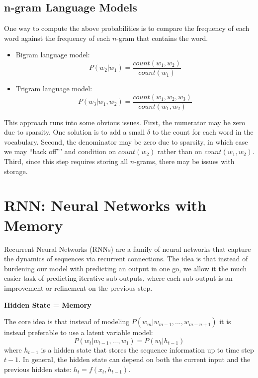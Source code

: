 \documentclass[
]{book}
\begin{document}
\hypertarget{n-gram-language-models}{%
\subsection{n-gram Language Models}\label{n-gram-language-models}}

One way to compute the above probabilities is to compare the frequency of each word against the frequency of each \(n\)-gram that contains the word.

\begin{itemize}
\item
  Bigram language model:
  \[
  P(w_2|w_1) = \frac{count(w_1, w_2)}{count(w_1)}
  \]
\item
  Trigram language model:
  \[
  P(w_3|w_1, w_2) = \frac{count(w_1, w_2, w_3)}{count(w_1, w_2)}
  \]
\end{itemize}

This approach runs into some obvious issues. First, the numerator may be zero due to sparsity. One solution is to add a small \(\delta\) to the count for each word in the vocabulary. Second, the denominator may be zero due to sparsity, in which case we may ``back off''' and condition on \(count(w_2)\) rather than on \(count(w_1, w_2)\). Third, since this step requires storing all \(n\)-grams, there may be issues with storage.

\hypertarget{rnn-neural-networks-with-memory}{%
\section{RNN: Neural Networks with Memory}\label{rnn-neural-networks-with-memory}}

Recurrent Neural Networks (RNNs) are a family of neural networks that capture the dynamics of sequences via recurrent connections. The idea is that instead of burdening our model with predicting an output in one go, we allow it the much easier task of predicting iterative sub-outputs, where each sub-output is an improvement or refinement on the previous step.

\textbf{Hidden State = Memory}

The core idea is that instead of modeling \(P(w_m | w_{m-1}, ..., w_{m-n+1})\) it is instead preferable to use a latent variable model:
\[
P(w_t | w_{t-1}, ..., w_1)=P(w_t | h_{t-1})
\]
where \(h_{t-1}\) is a hidden state that stores the sequence information up to time step \(t-1\). In general, the hidden state can depend on both the current input and the previous hidden state: \(h_t = f(x_t, h_{t-1})\).
\end{document}
